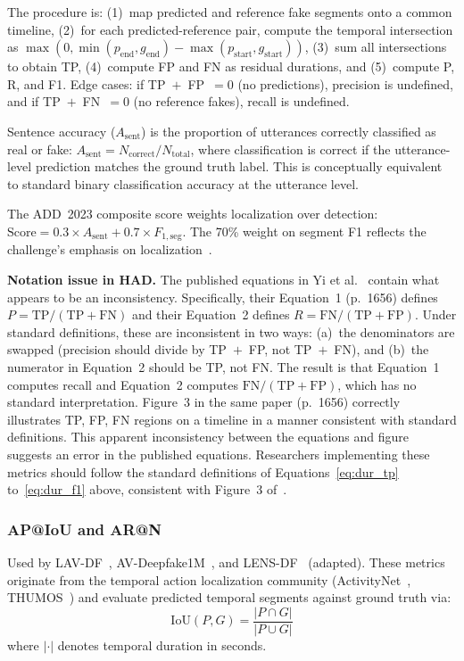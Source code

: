 \documentclass[journal]{IEEEtran}
\begin{document}
The procedure is: (1)~map predicted and reference fake segments onto a common timeline, (2)~for each predicted-reference pair, compute the temporal intersection as $\max(0, \min(p_\text{end}, g_\text{end}) - \max(p_\text{start}, g_\text{start}))$, (3)~sum all intersections to obtain TP, (4)~compute FP and FN as residual durations, and (5)~compute P, R, and F1. Edge cases: if TP~$+$~FP~$= 0$ (no predictions), precision is undefined, and if TP~$+$~FN~$= 0$ (no reference fakes), recall is undefined.

Sentence accuracy ($A_\text{sent}$) is the proportion of utterances correctly classified as real or fake: $A_\text{sent} = N_\text{correct} / N_\text{total}$, where classification is correct if the utterance-level prediction matches the ground truth label. This is conceptually equivalent to standard binary classification accuracy at the utterance level.

The ADD~2023 composite score weights localization over detection: $\text{Score} = 0.3 \times A_\text{sent} + 0.7 \times F_{1,\text{seg}}$. The 70\% weight on segment F1 reflects the challenge's emphasis on localization~\cite{yi2023add}.

\textbf{Notation issue in HAD.} The published equations in Yi et al.~\cite{yi2021had} contain what appears to be an inconsistency. Specifically, their Equation~1 (p.~1656) defines $P = \text{TP}/(\text{TP} + \text{FN})$ and their Equation~2 defines $R = \text{FN}/(\text{TP} + \text{FP})$. Under standard definitions, these are inconsistent in two ways: (a)~the denominators are swapped (precision should divide by TP~$+$~FP, not TP~$+$~FN), and (b)~the numerator in Equation~2 should be TP, not FN. The result is that Equation~1 computes recall and Equation~2 computes $\text{FN}/(\text{TP} + \text{FP})$, which has no standard interpretation. Figure~3 in the same paper (p.~1656) correctly illustrates TP, FP, FN regions on a timeline in a manner consistent with standard definitions. This apparent inconsistency between the equations and figure suggests an error in the published equations. Researchers implementing these metrics should follow the standard definitions of Equations~\eqref{eq:dur_tp} to~\eqref{eq:dur_f1} above, consistent with Figure~3 of~\cite{yi2021had}.

\subsubsection{AP@IoU and AR@N}
\label{sec:ap_iou}

Used by LAV-DF~\cite{cai2022lavdf}, AV-Deepfake1M~\cite{cai2024avdeepfake1m}, and LENS-DF~\cite{liu2025lensdf} (adapted). These metrics originate from the temporal action localization community (ActivityNet~\cite{heilbron2015activitynet}, THUMOS~\cite{idrees2017thumos}) and evaluate predicted temporal segments against ground truth via:
\begin{equation}
\label{eq:iou}
\text{IoU}(P, G) = \frac{|P \cap G|}{|P \cup G|}
\end{equation}
where $|{\cdot}|$ denotes temporal duration in seconds.
\end{document}
